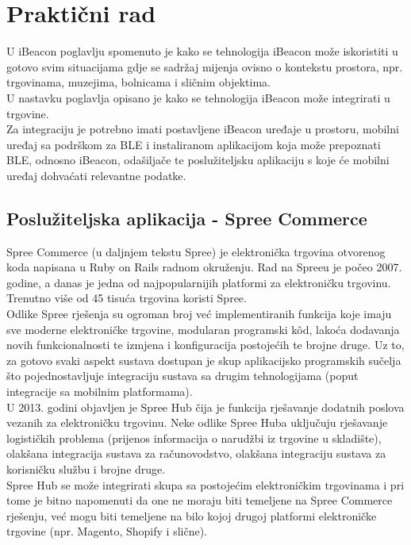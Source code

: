 \chapter{Praktični rad}

U iBeacon poglavlju spomenuto je kako se tehnologija iBeacon može iskoristiti u gotovo svim situacijama gdje se sadržaj mijenja ovisno o kontekstu prostora, npr. trgovinama, muzejima, bolnicama i sličnim objektima. 
\\
U nastavku poglavlja opisano je kako se tehnologija iBeacon može integrirati u trgovine. 
\\

Za integraciju je potrebno imati postavljene iBeacon uređaje u prostoru, mobilni uređaj sa podrškom za BLE i instaliranom aplikacijom koja može prepoznati BLE, odnosno iBeacon, odašiljače te poslužiteljsku aplikaciju s koje će mobilni uređaj dohvaćati relevantne podatke.  

\section{Poslužiteljska aplikacija - Spree Commerce}
\label{sec:server}

Spree Commerce (u daljnjem tekstu Spree) je elektronička trgovina  otvorenog koda napisana u Ruby on Rails radnom okruženju. 
Rad na Spreeu je počeo 2007. godine, a danas je jedna od najpopularnijih platformi za elektroničku trgovinu. 
Trenutno više od 45 tisuća trgovina koristi Spree. %
\\
Odlike Spree rješenja su ogroman broj već implementiranih funkcija koje imaju sve moderne elektroničke trgovine, modularan programski kôd, lakoća dodavanja novih funkcionalnosti te izmjena i konfiguracija postojećih te brojne druge. 
Uz to, za gotovo svaki aspekt sustava dostupan je skup aplikacijsko programskih sučelja što pojednostavljuje integraciju sustava sa drugim tehnologijama (poput integracije sa mobilnim platformama).
\\
U 2013. godini objavljen je Spree Hub čija je funkcija rješavanje dodatnih poslova vezanih za elektroničku trgovinu. 
Neke odlike Spree Huba uključuju rješavanje logističkih problema (prijenos informacija o narudžbi iz trgovine u skladište), olakšana integracija sustava za računovodstvo, olakšana integraciju sustava za korisničku službu i brojne druge.
\\
Spree Hub se može integrirati skupa sa postojećim elektroničkim trgovinama i pri tome je bitno napomenuti da one ne moraju biti temeljene na Spree Commerce rješenju, već mogu biti temeljene na bilo kojoj drugoj platformi elektroničke trgovine (npr. Magento, Shopify i slične). 

